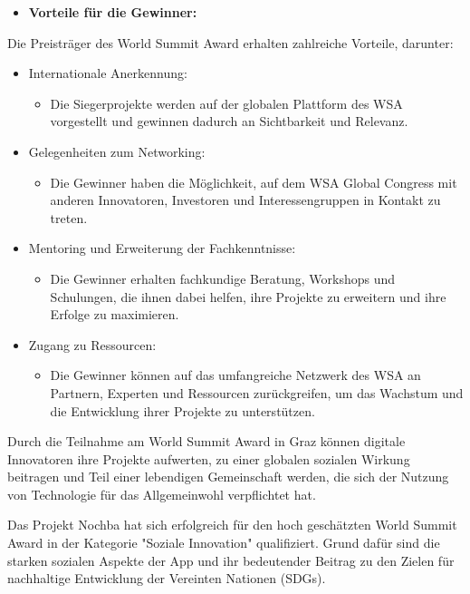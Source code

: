 \begin{itemize}
    \item \textbf{Vorteile für die Gewinner:}
\end{itemize}

Die Preisträger des World Summit Award erhalten zahlreiche Vorteile, darunter:

\begin{itemize}
    \item {Internationale Anerkennung:}
          \begin{itemize}
              \item {Die Siegerprojekte werden auf der globalen Plattform des WSA vorgestellt und gewinnen dadurch an Sichtbarkeit und Relevanz.}
          \end{itemize}
    \item {Gelegenheiten zum Networking:}
          \begin{itemize}
              \item {Die Gewinner haben die Möglichkeit, auf dem WSA Global Congress mit anderen Innovatoren, Investoren und Interessengruppen in Kontakt zu treten.}
          \end{itemize}
    \item {Mentoring und Erweiterung der Fachkenntnisse:}
          \begin{itemize}
              \item {Die Gewinner erhalten fachkundige Beratung, Workshops und Schulungen, die ihnen dabei helfen, ihre Projekte zu erweitern und ihre Erfolge zu maximieren.}
          \end{itemize}
    \item {Zugang zu Ressourcen:}
          \begin{itemize}
              \item {Die Gewinner können auf das umfangreiche Netzwerk des WSA an Partnern, Experten und Ressourcen zurückgreifen, um das Wachstum und die Entwicklung ihrer Projekte zu unterstützen.}
          \end{itemize}
\end{itemize}

Durch die Teilnahme am World Summit Award in Graz können digitale Innovatoren ihre Projekte aufwerten, zu einer globalen sozialen Wirkung beitragen und Teil einer lebendigen Gemeinschaft werden, die sich der Nutzung von Technologie für das Allgemeinwohl verpflichtet hat.

Das Projekt Nochba hat sich erfolgreich für den hoch geschätzten World Summit Award in der Kategorie "Soziale Innovation" qualifiziert. Grund dafür sind die starken sozialen Aspekte der App und ihr bedeutender Beitrag zu den Zielen für nachhaltige Entwicklung der Vereinten Nationen (SDGs).

